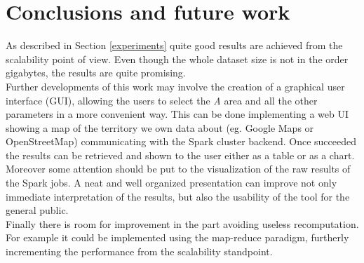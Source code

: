 \documentclass{sig-alternate-05-2015}
\begin{document}
\section{Conclusions and future work}
As described in Section \ref{experiments} quite good results are achieved from the scalability point of view. Even though the whole dataset size is not in the order gigabytes, the results are quite promising.\\
Further developments of this work may involve the creation of a graphical user interface (GUI), allowing the users to select the \emph{A} area and all the other parameters in a more convenient way. This can be done implementing a web UI showing a map of the territory we own data about (eg. Google Maps or OpenStreetMap) communicating with the Spark cluster backend. Once succeeded the results can be retrieved and shown to the user either as a table or as a chart.\\
Moreover some attention should be put to the visualization of the raw results of the Spark jobs. A neat and well organized presentation can improve not only immediate interpretation of the results, but also the usability of the tool for the general public.\\
Finally there is room for improvement in the part avoiding useless recomputation. For example it could be implemented using the map-reduce paradigm, furtherly incrementing the performance from the scalability standpoint. 


%



%
%
\end{document}
